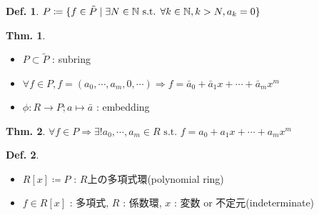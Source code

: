 \documentclass[uplatex,dvipdfmx,9pt]{beamer}
\newcommand{\st}{\text{ s.t. }}
\newcommand{\gt}{\ensuremath >}
\newcommand{\N}{\mathbb{N}}
\theoremstyle{definition} %
\newtheorem{defn}{Def.}[subsection] %
\newtheorem{thm}{Thm.}[subsection] %
\theoremstyle{example}
\begin{document}
\begin{frame}

  \begin{defn}
    $P \coloneqq \{f \in \tilde{P} \mid \exists N \in \N \st \forall k \in \N, k \gt N, a_k = 0\}$
  \end{defn}

  \begin{thm}
    \begin{itemize}
      \item $P \subset \tilde{P}$ : subring
      \item $\forall f \in P, f = (a_0, \cdots, a_m, 0, \cdots)\Rightarrow f = \bar{a}_0 + \bar{a}_1 x + \cdots + \bar{a}_m x^m$
      \item $\phi\colon R \to P; a \mapsto \bar{a}$ : embedding
    \end{itemize}
  \end{thm}

  \begin{thm}
    $\forall f \in P \Rightarrow \exists! a_0, \cdots, a_m \in R \st f = a_0 + a_1 x + \cdots + a_m x^m$
  \end{thm}

  \begin{defn}
    \begin{itemize}
      \item $R[x] \coloneqq P$ : $R$上の\alert{多項式環(polynomial ring)}
      \item $f \in R[x]$ : \alert{多項式}, $R$ : \alert{係数環}, $x$ : \alert{変数} or \alert{不定元(indeterminate)}
    \end{itemize}
  \end{defn}

\end{frame}
\end{document}
